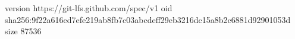version https://git-lfs.github.com/spec/v1
oid sha256:9f22a616ed7efe219ab8fb7c03abcdeff29eb3216dc15a8b2c6881d92901053d
size 87536
